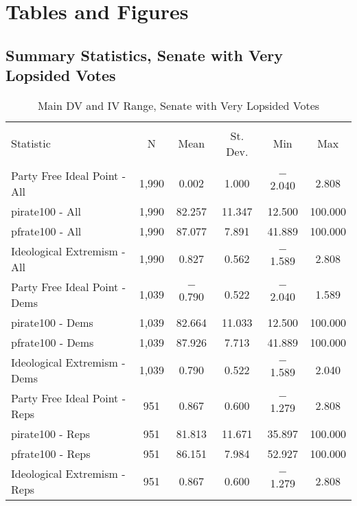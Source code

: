 \documentclass[12pt]{article}
\begin{document}
\pagebreak



\section{Tables and Figures}

\subsection{Summary Statistics, Senate with Very Lopsided Votes}

\begin{table}[!htbp] \centering 
	\caption{Main DV and IV Range, Senate with Very Lopsided Votes} 
	\begin{tabular}{@{\extracolsep{5pt}}lccccc} 
		\\[-1.8ex]\hline 
		\hline \\[-1.8ex] 
		Statistic & \multicolumn{1}{c}{N} & \multicolumn{1}{c}{Mean} & \multicolumn{1}{c}{St. Dev.} & \multicolumn{1}{c}{Min} & \multicolumn{1}{c}{Max} \\ 
		\hline \\[-1.8ex] 
		Party Free Ideal Point - All & 1,990 & 0.002 & 1.000 & $-$2.040 & 2.808 \\ 
		pirate100 - All & 1,990 & 82.257 & 11.347 & 12.500 & 100.000 \\ 
		pfrate100 - All & 1,990 & 87.077 & 7.891 & 41.889 & 100.000 \\ 
		Ideological Extremism - All & 1,990 & 0.827 & 0.562 & $-$1.589 & 2.808 \\ 
		\hline
		Party Free Ideal Point - Dems & 1,039 & $-$0.790 & 0.522 & $-$2.040 & 1.589 \\ 
		pirate100 - Dems & 1,039 & 82.664 & 11.033 & 12.500 & 100.000 \\ 
		pfrate100 - Dems & 1,039 & 87.926 & 7.713 & 41.889 & 100.000 \\ 
		Ideological Extremism - Dems & 1,039 & 0.790 & 0.522 & $-$1.589 & 2.040 \\ 
		\hline 
		Party Free Ideal Point - Reps & 951 & 0.867 & 0.600 & $-$1.279 & 2.808 \\ 
		pirate100 - Reps & 951 & 81.813 & 11.671 & 35.897 & 100.000 \\ 
		pfrate100 - Reps & 951 & 86.151 & 7.984 & 52.927 & 100.000 \\ 
		Ideological Extremism - Reps & 951 & 0.867 & 0.600 & $-$1.279 & 2.808 \\

\end{tabular}
\end{table}
\end{document}
